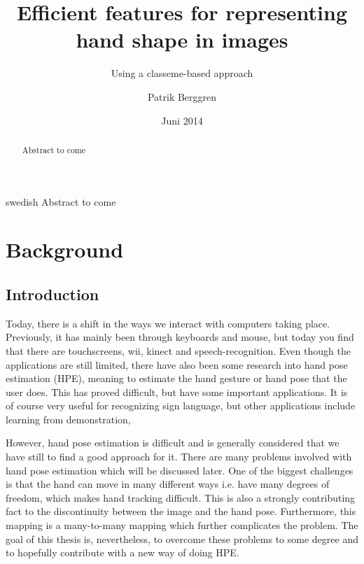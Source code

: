 \documentclass[a4paper,11pt]{kth-mag}
\title{Efficient features for representing hand shape in images}
\subtitle{Using a classeme-based approach}
\author{Patrik Berggren}
\date{Juni 2014}
\begin{document}
\frontmatter
\pagestyle{empty}
\removepagenumbers
\maketitle
{}



\begin{abstract}
Abstract to come
\end{abstract}
\clearpage
\begin{foreignabstract}{swedish}
Abstract to come
\end{foreignabstract}
\clearpage
\tableofcontents*
\mainmatter
\pagestyle{newchap}

\chapter{Background}
\section{Introduction}
Today, there is a shift in the ways we interact with computers taking place.
Previously, it has mainly been through keyboards and mouse, but today you find that there are touchscreens, wii, kinect and speech-recognition.
Even though the applications are still limited, there have also been some research into hand pose estimation (HPE), meaning to estimate the hand gesture or hand pose that the user does.
This has proved difficult, but have some important applications.
It is of course very useful for recognizing sign language, but other applications include learning from demonstration,

However, hand pose estimation is difficult and is generally considered that we have still to find a good approach for it.
There are many problems involved with hand pose estimation which will be discussed later.
One of the biggest challenges is that the hand can move in many different ways i.e. have many degrees of freedom, which makes hand tracking difficult.
This is also a strongly contributing fact to the discontinuity between the image and the hand pose.
Furthermore, this mapping is a many-to-many mapping which further complicates the problem.
The goal of this thesis is, nevertheless, to overcome these problems to some degree and to hopefully contribute with a new way of doing HPE.
\end{document}
